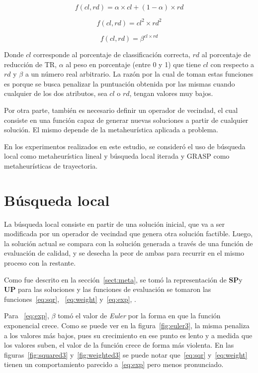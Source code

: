 \documentclass{ci5652}
\begin{document}
\begin{equation}\label{eq:weight}
f(cl,rd) = \alpha\times cl + (1 - \alpha)\times rd
\end{equation}

\begin{equation}\label{eq:sqr}
f(cl,rd) = cl^{2}\times rd^{2}
\end{equation}

\begin{equation}\label{eq:exp}
f(cl,rd) = \beta^{cl\times rd}
\end{equation}

Donde $cl$ corresponde al porcentaje de classificación correcta, $rd$ al porcentaje de reducción de TR, $\alpha$ al peso en porcentaje (entre 0 y 1) que tiene $cl$ con respecto a $rd$ y $\beta$ a un número real arbitrario. La razón por la cual de toman estas funciones es porque se busca penalizar la puntuación obtenida por las mismas cuando cualquier de los dos atributos, sea $cl$ o $rd$, tengan valores muy bajos.

Por otra parte, también es necesario definir un operador de vecindad, el cual consiste en una función capaz de generar nuevas soluciones a partir de cualquier solución. El mismo depende de la metaheurística aplicada a problema.

En los experimentos realizados en este estudio, se consideró el uso de búsqueda local como metaheurística lineal y búsqueda local iterada y GRASP como metaheurísticas de trayectoria.

\section{Búsqueda local}

La búsqueda local consiste en partir de una solución inicial, que va a ser modificada por un operador de vecindad que genera otra solución factible. Luego, la solución actual se compara con la solución generada a través de una función de evaluación de calidad, y se desecha la peor de ambas para recurrir en el mismo proceso con la restante.

Como fue descrito en la sección~\ref{sect:meta}, se tomó la representación de \textbf{SP}y \textbf{UP} para las soluciones y las funciones de evaluación se tomaron las funciones~\ref{eq:sqr}, ~\ref{eq:weight} y~\ref{eq:exp}, .

Para ~\ref{eq:exp}, $\beta$ tomó el valor de \textit{Euler} por la forma en que la función exponencial crece. Como se puede ver en la figura~\ref{fig:euler3}, la misma penaliza a los valores más bajos, pues su crecimiento en ese punto es lento y a medida que los valores suben, el valor de la función crece de forma más violenta. En las figuras~\ref{fig:squared3} y~\ref{fig:weighted3} se puede notar que~\ref{eq:sqr} y~\ref{eq:weight} tienen un comportamiento parecido a~\ref{eq:exp} pero menos pronunciado. 
\end{document}

